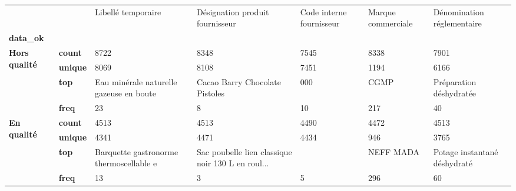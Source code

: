 \begin{tabularx}{\linewidth}{lXXXXXX}
\toprule
           &      &                       Libellé temporaire &                    Désignation produit fournisseur & Code interne fournisseur & Marque commerciale &    Dénomination réglementaire \\
\textbf{data\_ok} & {} &                                          &                                                    &                          &                    &                               \\
\midrule
\multirow{4}{*}{\textbf{Hors qualité}} & \textbf{count} &                                     8722 &                                               8348 &                     7545 &               8338 &                          7901 \\
           & \textbf{unique} &                                     8069 &                                               8108 &                     7451 &               1194 &                          6166 \\
           & \textbf{top} &  Eau minérale naturelle gazeuse en boute &                     Cacao Barry Chocolate Pistoles &                      000 &               CGMP &       Préparation déshydratée \\
           & \textbf{freq} &                                       23 &                                                  8 &                       10 &                217 &                            40 \\
\cline{1-7}
\multirow{4}{*}{\textbf{En qualité}} & \textbf{count} &                                     4513 &                                               4513 &                     4490 &               4472 &                          4513 \\
           & \textbf{unique} &                                     4341 &                                               4471 &                     4434 &                946 &                          3765 \\
           & \textbf{top} &  Barquette gastronorme thermoscellable e &  Sac poubelle lien classique noir 130 L en roul... &                          &          NEFF MADA &  Potage instantané déshydraté \\
           & \textbf{freq} &                                       13 &                                                  3 &                        5 &                296 &                            60 \\
\bottomrule
\end{tabularx}
